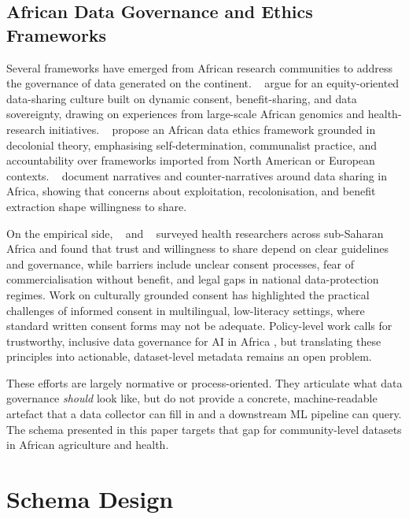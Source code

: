 \documentclass{article}
\begin{document}
\subsection{African Data Governance and Ethics Frameworks}

Several frameworks have emerged from African research communities to address the governance of data generated on the continent. \citeauthor{munung2025}~ argue for an equity-oriented data-sharing culture built on dynamic consent, benefit-sharing, and data sovereignty, drawing on experiences from large-scale African genomics and health-research initiatives. \citeauthor{barrett2025}~ propose an African data ethics framework grounded in decolonial theory, emphasising self-determination, communalist practice, and accountability over frameworks imported from North American or European contexts. \citeauthor{abebe2021}~ document narratives and counter-narratives around data sharing in Africa, showing that concerns about exploitation, recolonisation, and benefit extraction shape willingness to share.

On the empirical side, \citeauthor{brown2024}~ and \citeauthor{chabilall2024}~ surveyed health researchers across sub-Saharan Africa and found that trust and willingness to share depend on clear guidelines and governance, while barriers include unclear consent processes, fear of commercialisation without benefit, and legal gaps in national data-protection regimes. Work on culturally grounded consent \cite{omutoko2024} has highlighted the practical challenges of informed consent in multilingual, low-literacy settings, where standard written consent forms may not be adequate. Policy-level work calls for trustworthy, inclusive data governance for AI in Africa \cite{effoduh2024}, but translating these principles into actionable, dataset-level metadata remains an open problem.

These efforts are largely normative or process-oriented. They articulate what data governance \emph{should} look like, but do not provide a concrete, machine-readable artefact that a data collector can fill in and a downstream ML pipeline can query. The schema presented in this paper targets that gap for community-level datasets in African agriculture and health.

\section{Schema Design}
\label{sec:schema}
\end{document}
